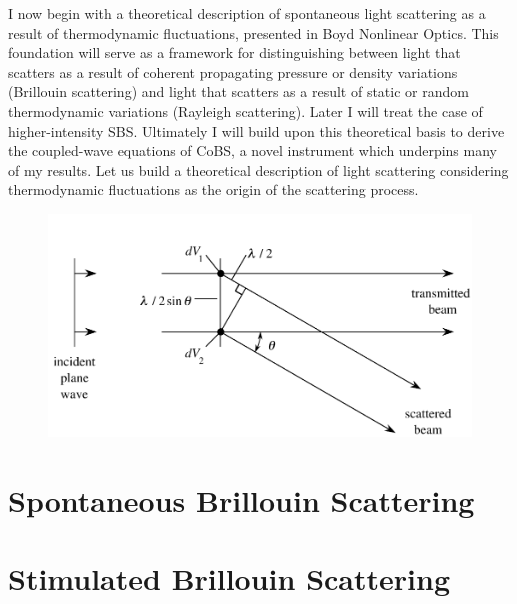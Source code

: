 I now begin with a theoretical description of spontaneous light scattering as a result of thermodynamic fluctuations, presented in Boyd Nonlinear Optics.\cite{boyd2020nonlinear} This foundation will serve as a framework for distinguishing between light that scatters as a result of coherent propagating pressure or density variations (Brillouin scattering) and light that scatters as a result of static or random thermodynamic variations (Rayleigh scattering). Later I will treat the case of higher-intensity \ac{SBS}. Ultimately I will build upon this theoretical basis to derive the coupled-wave equations of \ac{CoBS}, a novel instrument which underpins many of my results. Let us build a theoretical description of light scattering considering thermodynamic fluctuations as the origin of the scattering process.



\begin{figure}[t] %
\centering
\includegraphics[width=\textwidth]{figs/1-Intro/Boyd homogeneous material no scatter.png}
\caption{}
\label{fig:Introduction:homogeneous-material-no-scatter}
\end{figure}

\section{Spontaneous Brillouin Scattering}
\label{sec:Introduction:Spontaneous-Brillouin}


\section{Stimulated Brillouin Scattering}
\label{sec:Introduction:Stimulated}


